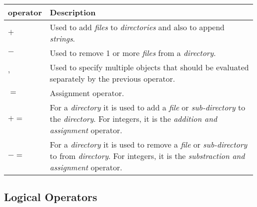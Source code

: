 \documentclass[11pt]{article}
\begin{document}
\begin{table}[ht]
  \centering
  \vspace{0.5em}
  \begin{tabular}{|m{8em}|b{34em}|}
  \hline

  \textbf{operator}
  &
  \vspace{0.7em}
  \textbf{Description} \\ [0.7em]
  \hline

  $+$
  &
  \vspace{0.7em}
  Used to add \emph{files} to \emph{directories} and also to append \emph{strings}.
  \\[0.7em]
  \hline

  $-$
  &
  \vspace{0.7em}
  Used to remove 1 or more \emph{files} from a \emph{directory}.
  \\[0.7em]
  \hline

  \vspace{-0.9em}
  $,$
  &
  \vspace{0.7em}
  Used to specify multiple objects that should be evaluated separately by the previous operator.
  \\[0.7em]
  \hline

  $=$
  &
  \vspace{0.7em}
  Assignment operator.
  \\[0.7em]
  \hline

  \vspace{-0.9em}
  $+=$
  &
  \vspace{0.7em}
  For a \emph{directory} it is used to add a \emph{file} or \emph{sub-directory} to the \emph{directory}. For integers, it is the \emph{addition and assignment} operator.
  \\[0.7em]
  \hline

  \vspace{-0.9em}
  $-=$
  &
  \vspace{0.7em}
  For a \emph{directory} it is used to remove a \emph{file} or \emph{sub-directory} to from \emph{directory}. For integers, it is the \emph{substraction and assignment} operator.
  \\[0.7em]
  \hline

  \end{tabular}
\end{table}

\subsection{Logical Operators}
\end{document}
